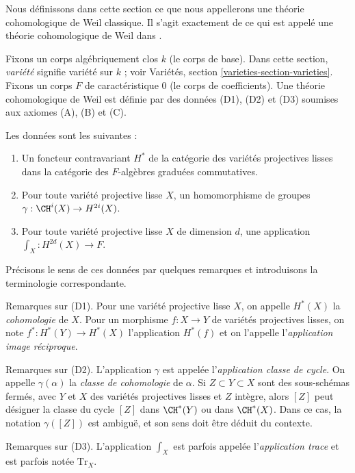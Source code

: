 \noindent
Nous définissons dans cette section ce que nous appellerons une théorie
cohomologique de Weil classique. Il s'agit exactement de ce qui est appelé
une théorie cohomologique de Weil dans \cite[Section 1.2]{Kleiman-cycles}.

\medskip\noindent
Fixons un corps algébriquement clos $k$ (le corps de base).
Dans cette section, {\it variété} signifie variété sur $k$ ; voir
Variétés, section \ref{varieties-section-varieties}.
Fixons un corps $F$ de caractéristique $0$ (le corps de coefficients).
Une théorie cohomologique de Weil est définie par des données (D1), (D2) et (D3)
soumises aux axiomes (A), (B) et (C).

\medskip\noindent
Les données sont les suivantes :
\begin{enumerate}
\item[(D1)] Un foncteur contravariant $H^*$ de la catégorie
des variétés projectives lisses dans la catégorie des
$F$-algèbres graduées commutatives.
\item[(D2)] Pour toute variété projective lisse $X$,
un homomorphisme de groupes $\gamma : \CH^i(X) \to H^{2i}(X)$.
\item[(D3)] Pour toute variété projective lisse $X$ de dimension $d$,
une application $\int_X : H^{2d}(X) \to F$.
\end{enumerate}
Précisons le sens de ces données par quelques remarques
et introduisons la terminologie correspondante.

\medskip\noindent
Remarques sur (D1). Pour une variété projective lisse $X$,
on appelle $H^*(X)$ la {\it cohomologie} de $X$. Pour un morphisme
$f : X \to Y$ de variétés projectives lisses, on note
$f^* : H^*(Y) \to H^*(X)$ l'application $H^*(f)$ et on l'appelle
l'{\it application image réciproque}.

\medskip\noindent
Remarques sur (D2). L'application $\gamma$ est appelée l'{\it application classe de cycle}.
On appelle $\gamma(\alpha)$ la {\it classe de cohomologie} de $\alpha$.
Si $Z \subset Y \subset X$ sont des sous-schémas fermés, avec $Y$ et $X$
des variétés projectives lisses et $Z$ intègre, alors $[Z]$ peut
désigner la classe du cycle $[Z]$ dans $\CH^*(Y)$ ou dans $\CH^*(X)$.
Dans ce cas, la notation $\gamma([Z])$ est ambiguë, et son sens
doit être déduit du contexte.

\medskip\noindent
Remarques sur (D3). L'application $\int_X$ est parfois appelée
l'{\it application trace} et est parfois notée $\text{Tr}_X$.

